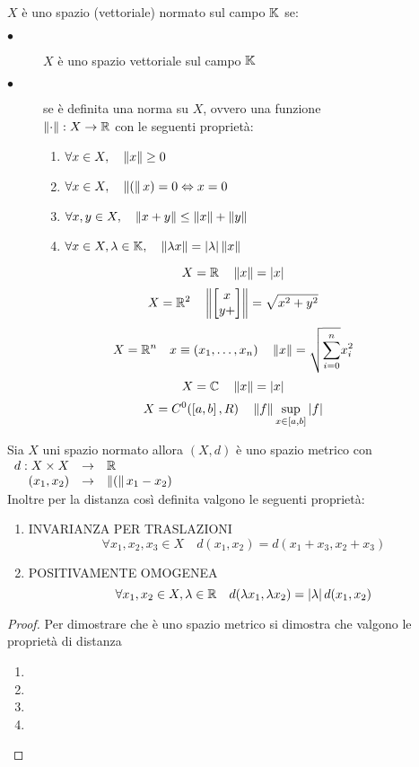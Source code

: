 $X$ è uno spazio (vettoriale) normato sul campo $\mathbb{K}$ se:
\begin{description}
	\item[$\bullet$] $X$ è uno spazio vettoriale sul campo $\mathbb{K}$
	\item[$\bullet$] se è definita una norma su $X$, ovvero una funzione\\
	$\left\| \cdot \right\|:X\to\mathbb{R}$ con le seguenti proprietà:
	\begin{enumerate}
		\item $\forall x\in X,\quad\left\|x\right\|\ge0$
		\item $\forall x\in X,\quad\left\|(\right\|x)=0\Leftrightarrow x=0$
		\item $\forall x,y\in X,\quad\left\|x+y\right\|\le\left\|x\right\|+\left\|y\right\|$
		\item $\forall x\in X,\lambda\in\mathbb{K},\quad\left\|\lambda x\right\|=\left|\lambda\right|\left\|x\right\|$
	\end{enumerate}
\end{description}

\example
$$X=\mathbb{R}\quad\left\|x\right\|=\left|x\right|$$
\example
$$X=\mathbb{R}^{2}\quad\left\|\left[\begin{matrix}x\\y+\end{matrix}\right]\right\|=\sqrt{x^2+y^2}$$
\example
$$X=\mathbb{R}^{n}\quad x\equiv(x_1,\ldots,x_n)\quad \left\|x\right\|=\sqrt{\sum\limits_{i=0}^n}x_i^2$$
\example
$$X=\mathbb{C}\quad\left\|x\right\|=\left|x\right|$$
\example
$$X=C^0(\left[a,b\right],R)\quad\left\|f\right\|\sup\limits_{x\in\left[a,b\right]}\left|f\right|$$

\proposition
Sia $X$ uni spazio normato allora $(X,d)$ è uno spazio metrico con $\begin{array}{rcl} d : X\times X & \to & \mathbb{R} \\ (x_1,x_2) & \to & \left\|(\right\|x_1-x_2) \end{array}$\\
Inoltre per la distanza così definita valgono le seguenti proprietà:
\begin{enumerate}
	\item INVARIANZA PER TRASLAZIONI
	$$\forall x_1,x_2,x_3\in X \quad d(x_1,x_2)=d(x_1+x_3,x_2+x_3)$$
	\item POSITIVAMENTE OMOGENEA
	$$ \forall x_1,x_2\in X, \lambda\in\mathbb{R}\quad d(\lambda x_1,\lambda x_2)=\left|\lambda\right|d(x_1,x_2)$$
\end{enumerate}
\begin{proof}
	Per dimostrare che è uno spazio metrico si dimostra che valgono le proprietà di distanza
	\begin{enumerate}
		\item
		\item
		\item
		\item
	\end{enumerate}
\end{proof}

